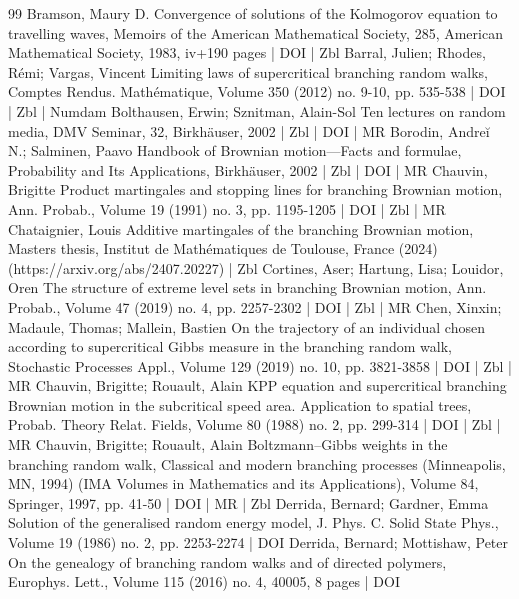 \documentclass[10pt]{amsart}
\theoremstyle{definition}\newtheorem{defi}[theo]{Definition}\newtheorem{rema}[theo]{Remark}\newtheorem{exam}[theo]{Example}\newtheorem{exem}[theo]{Example}\newtheorem{nota}[theo]{Notation}
\newcommand\1{\mathds{1}}
\begin{document}
\begin{thebibliography}{99}
 Bramson, Maury D. Convergence of solutions of the Kolmogorov equation to travelling waves, Memoirs of the American Mathematical Society, 285, American Mathematical Society, 1983, iv+190 pages | DOI | Zbl
 Barral, Julien; Rhodes, Rémi; Vargas, Vincent Limiting laws of supercritical branching random walks, Comptes Rendus. Mathématique, Volume 350 (2012) no. 9-10, pp. 535-538 | DOI | Zbl | Numdam
 Bolthausen, Erwin; Sznitman, Alain-Sol Ten lectures on random media, DMV Seminar, 32, Birkhäuser, 2002 | Zbl | DOI | MR
 Borodin, Andreĭ N.; Salminen, Paavo Handbook of Brownian motion—Facts and formulae, Probability and Its Applications, Birkhäuser, 2002 | Zbl | DOI | MR
 Chauvin, Brigitte Product martingales and stopping lines for branching Brownian motion, Ann. Probab., Volume 19 (1991) no. 3, pp. 1195-1205 | DOI | Zbl | MR
 Chataignier, Louis Additive martingales of the branching Brownian motion, Masters thesis, Institut de Mathématiques de Toulouse, France (2024) (https://arxiv.org/abs/2407.20227) | Zbl
 Cortines, Aser; Hartung, Lisa; Louidor, Oren The structure of extreme level sets in branching Brownian motion, Ann. Probab., Volume 47 (2019) no. 4, pp. 2257-2302 | DOI | Zbl | MR
 Chen, Xinxin; Madaule, Thomas; Mallein, Bastien On the trajectory of an individual chosen according to supercritical Gibbs measure in the branching random walk, Stochastic Processes Appl., Volume 129 (2019) no. 10, pp. 3821-3858 | DOI | Zbl | MR
 Chauvin, Brigitte; Rouault, Alain KPP equation and supercritical branching Brownian motion in the subcritical speed area. Application to spatial trees, Probab. Theory Relat. Fields, Volume 80 (1988) no. 2, pp. 299-314 | DOI | Zbl | MR
 Chauvin, Brigitte; Rouault, Alain Boltzmann–Gibbs weights in the branching random walk, Classical and modern branching processes (Minneapolis, MN, 1994) (IMA Volumes in Mathematics and its Applications), Volume 84, Springer, 1997, pp. 41-50 | DOI | MR | Zbl
 Derrida, Bernard; Gardner, Emma Solution of the generalised random energy model, J. Phys. C. Solid State Phys., Volume 19 (1986) no. 2, pp. 2253-2274 | DOI
 Derrida, Bernard; Mottishaw, Peter On the genealogy of branching random walks and of directed polymers, Europhys. Lett., Volume 115 (2016) no. 4, 40005, 8 pages | DOI

\end{thebibliography}
\end{document}
